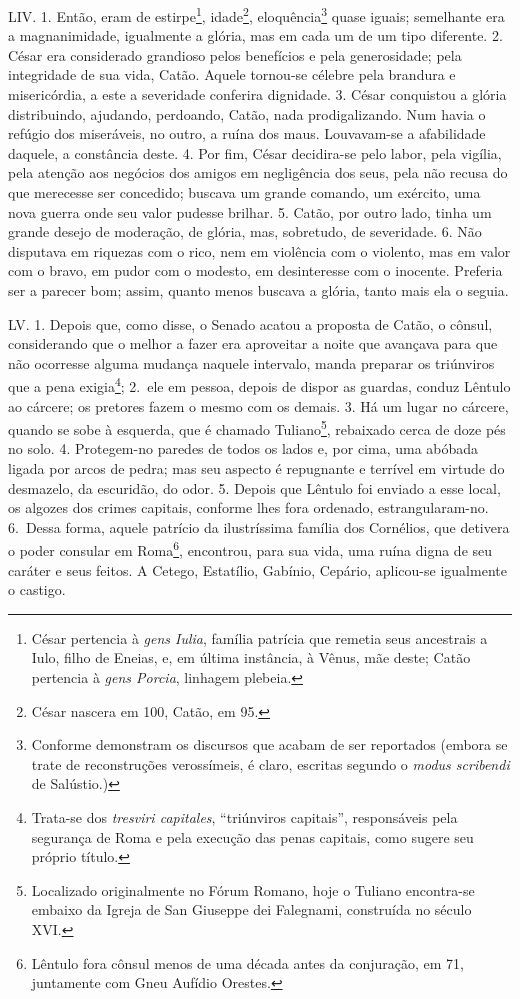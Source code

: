 LIV. 1. Então, eram de estirpe\footnote{César pertencia à \emph{gens Iulia},
família patrícia que remetia seus ancestrais a Iulo, filho de Eneias, e, em
última instância, à Vênus, mãe deste; Catão pertencia à \emph{gens Porcia},
linhagem plebeia.}, idade\footnote{César nascera em 100, Catão, em 95.},
eloquência\footnote{Conforme demonstram os discursos que acabam de ser
reportados (embora se trate de reconstruções verossímeis, é claro, escritas
segundo o \emph{modus scribendi} de Salústio.)} quase iguais; semelhante era a
magnanimidade, igualmente a glória, mas em cada um de um tipo diferente. 2.
César era considerado grandioso pelos benefícios e pela generosidade; pela
integridade de sua vida, Catão. Aquele tornou-se célebre pela brandura e
misericórdia, a este a severidade conferira dignidade. 3. César conquistou a
glória distribuindo, ajudando, perdoando, Catão, nada prodigalizando. Num havia
o refúgio dos miseráveis, no outro, a ruína dos maus. Louvavam-se a afabilidade
daquele, a constância deste. 4. Por fim, César decidira-se pelo labor, pela
vigília, pela atenção aos negócios dos amigos em negligência dos seus, pela não
recusa do que merecesse ser concedido; buscava um grande comando, um exército,
uma nova guerra onde seu valor pudesse brilhar. 5. Catão, por outro lado, tinha
um grande desejo de moderação, de glória, mas, sobretudo, de severidade. 6. Não
disputava em riquezas com o rico, nem em violência com o violento, mas em valor
com o bravo, em pudor com o modesto, em desinteresse com o inocente. Preferia
ser a parecer bom; assim, quanto menos buscava a glória, tanto mais ela o
seguia. 

LV. 1. Depois que, como disse, o Senado acatou a proposta de Catão, o cônsul,
considerando que o melhor a fazer era aproveitar a noite que avançava para que
não ocorresse alguma mudança naquele intervalo, manda preparar os triúnviros
que a pena exigia\footnote{Trata-se dos \emph{tresviri capitales}, ``triúnviros
capitais'', responsáveis pela segurança de Roma e pela execução das penas
capitais, como sugere seu próprio título.}; 2.~ele em pessoa, depois de dispor
as guardas, conduz Lêntulo ao cárcere; os pretores fazem o mesmo com os demais.
3. Há um lugar no cárcere, quando se sobe à esquerda, que é chamado
Tuliano\footnote{Localizado originalmente no Fórum Romano, hoje o Tuliano
encontra-se embaixo da Igreja de San Giuseppe dei Falegnami, construída no
século XVI.}, rebaixado cerca de doze pés no solo. 4. Protegem-no paredes de
todos os lados e, por cima, uma abóbada ligada por arcos de pedra; mas seu
aspecto é repugnante e terrível em virtude do desmazelo, da escuridão, do odor.
5. Depois que Lêntulo foi enviado a esse local, os algozes dos crimes capitais,
conforme lhes fora ordenado, estrangularam-no. 6.~Dessa forma, aquele patrício
da ilustríssima família dos Cornélios, que detivera o poder consular em
Roma\footnote{Lêntulo fora cônsul menos de uma década antes da conjuração, em
71, juntamente com Gneu Aufídio Orestes.}, encontrou, para sua vida, uma ruína
digna de seu caráter e seus feitos. A Cetego, Estatílio, Gabínio, Cepário,
aplicou-se igualmente o castigo.

